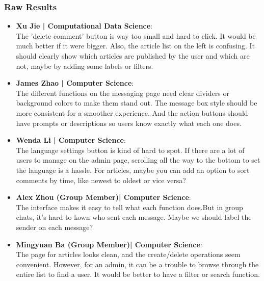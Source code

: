 \documentclass[12pt]{article}
\begin{document}
    \subsubsection*{Raw Results}
        \begin{itemize}
            \item \textbf{Xu Jie | Computational Data Science}:\\
                The 'delete comment' button is way too small and hard to click. It would be much better if it were bigger. Also, the article list on the left is confusing. It should clearly show which articles are published by the user and which are not, maybe by adding some labels or filters.

            \item \textbf{James Zhao | Computer Science}: \\
                The different functions on the messaging page need clear dividers or background colors to make them stand out. The message box style should be more consistent for a smoother experience. And the action buttons should have prompts or descriptions so users know exactly what each one does.

            \item \textbf{Wenda Li | Computer Science}: \\
                The language settings button is kind of hard to spot. If there are a lot of users to manage on the admin page, scrolling all the way to the bottom to set the language is a hassle. For articles, maybe you can add an option to sort comments by time, like newest to oldest or vice versa?

            \item \textbf{Alex Zhou (Group Member)| Computer Science}: \\
                The interface makes it easy to tell what each function does.But in group chats, it’s hard to kown who sent each message. Maybe we should label the sender on each message?

            \item \textbf{Mingyuan Ba (Group Member)| Computer Science}: \\
                The page for articles looks clean, and the create/delete operations seem convenient. However, for an admin, it can be a trouble to browse through the entire list to find a user. It would be better to have a filter or search function.
        \end{itemize}
\end{document}
